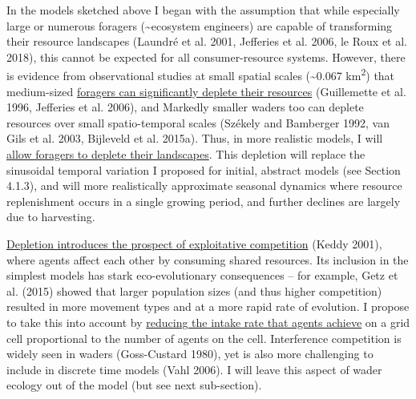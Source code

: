 \documentclass[]{scrartcl}
\begin{document}
\begin{linenumbers}
In the models sketched above I began with the assumption that while
especially large or numerous foragers (\textasciitilde{}ecosystem
engineers) are capable of transforming their resource landscapes
(\protect\hypertarget{__UnoMark__39682_623588325}{}{\protect\hypertarget{__UnoMark__53987_4107183634}{}{\protect\hypertarget{ZOTERO_BREF_fcX53t473plV}{}{\protect\hypertarget{__UnoMark__25961_4107183634}{}{}}}}Laundré
et al. 2001, Jefferies et al. 2006, le Roux et al. 2018), this cannot be
expected for all consumer-resource systems. However, there is evidence
from observational studies at small spatial scales
(\textasciitilde{}0.067 km\textsuperscript{2}) that medium-sized
\underline{foragers can significantly deplete their resources}
(\protect\hypertarget{__UnoMark__4229_580056431}{}{}Guillemette et al.
1996, Jefferies et al. 2006), and Markedly smaller waders too can
deplete resources over small spatio-temporal scales
(\protect\hypertarget{__UnoMark__53989_4107183634}{}{\protect\hypertarget{__UnoMark__39684_623588325}{}{\protect\hypertarget{ZOTERO_BREF_gOGq7DesBbt8}{}{\protect\hypertarget{__UnoMark__26352_4107183634}{}{\protect\hypertarget{__UnoMark__26334_4107183634}{}{}}}}}Székely
and Bamberger 1992, van Gils et al. 2003, Bijleveld et al. 2015a). Thus,
in more realistic models, I will \underline{allow foragers to deplete their
landscapes}. This depletion will replace the sinusoidal temporal
variation I proposed for initial, abstract models (see Section 4.1.3),
and will more realistically approximate seasonal dynamics where resource
replenishment occurs in a single growing period, and further declines
are largely due to harvesting.

\underline{Depletion introduces the prospect of exploitative competition}
(\protect\hypertarget{__UnoMark__4272_580056431}{}{}Keddy 2001), where
agents affect each other by consuming shared resources. Its inclusion in
the simplest models has stark eco-evolutionary consequences -- for
example, Getz et al. (2015) showed that larger population sizes (and
thus higher competition) resulted in more movement types and at a more
rapid rate of evolution. I propose to take this into account by
\underline{reducing the intake rate that agents achieve} on a grid cell
proportional to the number of agents on the cell. Interference
competition is widely seen in waders
(\protect\hypertarget{__UnoMark__4279_580056431}{}{}Goss-Custard 1980),
yet is also more challenging to include in discrete time models
(\protect\hypertarget{__UnoMark__4286_580056431}{}{}Vahl 2006). I will
leave this aspect of wader ecology out of the model (but see next
sub-section).


\end{linenumbers}
\end{document}
